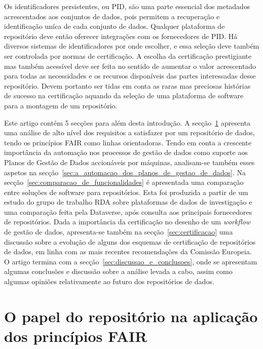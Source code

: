 \documentclass[sigconf,nonacm]{acmart}
\begin{document}
Os identificadores persistentes, ou \gls{PID}, são uma parte essencial dos metadados acrescentados aos conjuntos de dados, pois permitem a recuperação e identificação uníca de cada conjunto de dados. Qualquer plataforma de repositório deve então oferecer integrações com os fornecedores de \gls{PID}. Há diversos sistemas de identificadores por onde escolher, e essa seleção deve também ser controlada por normas de certificação. A escolha da certificação prestigiante mas também acessível deve ser feita no sentido de aumentar o valor acrescentado para todas as necessidades e os recursos disponíveis das partes interessadas desse repositório. Devem portanto ser tidas em conta as raras mas preciosas histórias de sucesso na certificação aquando da seleção de uma plataforma de software para a montagem de um repositório.

Este artigo contém 5 secções para além desta introdução. A secção~\ref{sec:o_papel_do_repositorio_na_aplicacao_dos_principios_fair} apresenta uma análise de alto nível dos requisitos a satisfazer por um repositório de dados, tendo os princípios \gls{FAIR} como linhas orientadoras.
%
Tendo em conta a crescente importância da automação nos processos de gestão de dados como suporte aos Planos de Gestão de Dados accionáveis por máquinas, analisam-se também esses aspetos na secção~\ref{sec:a_automacao_dos_planos_de_gestao_de_dados}.
%
Na secção~\ref{sec:comparacao_de_funcionalidades} é apresentada uma comparação entre soluções de software para repositórios. Esta foi produzida a partir de um estudo do grupo de trabalho RDA sobre plataformas de dados de investigação e uma comparação feita pela Dataverse, após consulta aos principais fornecedores de repositórios.
%
Dada a importância da certificação no desenho de um \emph{workflow} de gestão de dados, apresenta-se também na secção~\ref{sec:certificacao} uma discussão sobre a evolução de alguns dos esquemas de certificação de repositórios de dados, em linha com as mais recentes recomendações da Comissão Europeia.
%
O artigo termina com a secção~\ref{sec:discussao_e_conclusoes}, onde se apresentam algumas conclusões e discussão sobre a análise levada a cabo, assim como algumas opiniões relativamente ao futuro dos repositórios de dados.

\section{O papel do repositório na aplicação dos princípios FAIR} %
\label{sec:o_papel_do_repositorio_na_aplicacao_dos_principios_fair}
\end{document}
